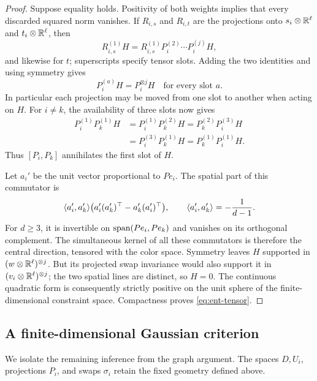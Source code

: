 \begin{proof}
Suppose equality holds. Positivity of both weights implies that
every discarded squared norm vanishes. If \(R_{i,s}\) and
\(R_{i,t}\) are the projections onto
\(s_i\otimes\mathbb R^\ell\) and \(t_i\otimes\mathbb R^\ell\), then
\[
 R_{i,s}^{(1)}H
 =R_{i,s}^{(1)}P_i^{(2)}\cdots P_i^{(j)}H,
\]
and likewise for \(t\); superscripts specify tensor slots.
Adding the two identities and using symmetry gives
\begin{equation}\label{eq:ent-slot-transfer}
 P_i^{(a)}H=P_i^{\otimes j}H
 \quad\text{for every slot }a.
\end{equation}
In particular each projection may be moved from one slot to
another when acting on \(H\).
For \(i\ne k\), the availability of three slots now gives
\begin{align*}
 P_i^{(1)}P_k^{(1)}H
 &=P_i^{(1)}P_k^{(2)}H
  =P_k^{(2)}P_i^{(3)}H\\
 &=P_i^{(3)}P_k^{(1)}H
  =P_k^{(1)}P_i^{(1)}H .
\end{align*}
Thus \([P_i,P_k]\) annihilates the first slot of \(H\).

Let \(a_i'\) be the unit vector proportional to \(Pe_i\).
The spatial part of this commutator is
\[
 \langle a_i',a_k'\rangle
       \bigl(a_i'(a_k')^\top-a_k'(a_i')^\top\bigr),
 \qquad \langle a_i',a_k'\rangle=-\frac1{d-1}.
\]
For \(d\ge3\), it is invertible on
\(\operatorname{span}(Pe_i,Pe_k)\) and vanishes on its orthogonal complement.
The simultaneous kernel of all these commutators is therefore
the central direction, tensored with the color space.
Symmetry leaves \(H\) supported in
\((w\otimes\mathbb R^\ell)^{\otimes j}\).
But its projected swap invariance would also support it in
\((v_i\otimes\mathbb R^\ell)^{\otimes j}\); the two spatial lines are
distinct, so \(H=0\).
The continuous quadratic form is consequently strictly positive
on the unit sphere of the finite-dimensional constraint space.
Compactness proves \eqref{eq:ent-tensor}.
\end{proof}

\subsection{A finite-dimensional Gaussian criterion}

We isolate the remaining inference from the graph argument. The spaces
\(D,U_i\), projections \(P_i\), and swaps \(\sigma_i\) retain the
fixed geometry defined above.

